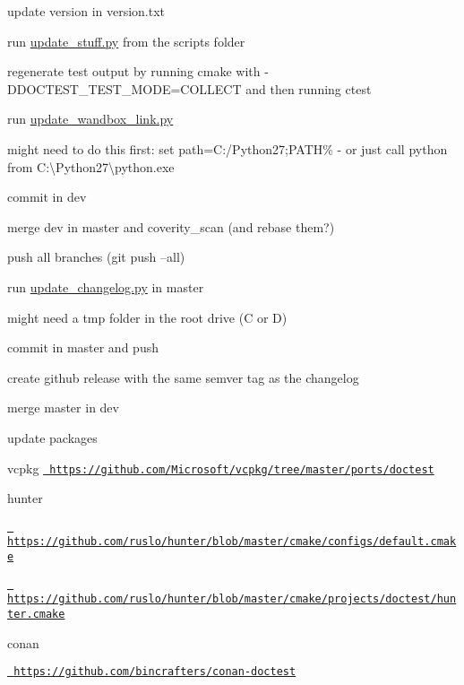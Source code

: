
\begin{DoxyItemize}
\item update version in version.\+txt
\end{DoxyItemize}

run \mbox{\hyperlink{update__stuff_8py}{update\+\_\+stuff.\+py}} from the scripts folder
\begin{DoxyItemize}
\item regenerate test output by running cmake with -\/DDOCTEST\+\_\+\+TEST\+\_\+\+MODE=COLLECT and then running ctest
\item run \mbox{\hyperlink{update__wandbox__link_8py}{update\+\_\+wandbox\+\_\+link.\+py}}
\begin{DoxyItemize}
\item might need to do this first\+: set path=C\+:/\+Python27;PATH\% -\/ or just call python from C\+:\textbackslash{}\+Python27\textbackslash{}python.exe
\end{DoxyItemize}
\item commit in dev
\item merge dev in master and coverity\+\_\+scan (and rebase them?)
\item push all branches (git push --all)
\item run \mbox{\hyperlink{update__changelog_8py}{update\+\_\+changelog.\+py}} in master
\begin{DoxyItemize}
\item might need a tmp folder in the root drive (C or D)
\end{DoxyItemize}
\item commit in master and push
\item create github release with the same semver tag as the changelog
\item merge master in dev
\item update packages
\begin{DoxyItemize}
\item vcpkg \href{https://github.com/Microsoft/vcpkg/tree/master/ports/doctest}{\texttt{ https\+://github.\+com/\+Microsoft/vcpkg/tree/master/ports/doctest}}
\item hunter
\begin{DoxyItemize}
\item \href{https://github.com/ruslo/hunter/blob/master/cmake/configs/default.cmake}{\texttt{ https\+://github.\+com/ruslo/hunter/blob/master/cmake/configs/default.\+cmake}}
\item \href{https://github.com/ruslo/hunter/blob/master/cmake/projects/doctest/hunter.cmake}{\texttt{ https\+://github.\+com/ruslo/hunter/blob/master/cmake/projects/doctest/hunter.\+cmake}}
\end{DoxyItemize}
\item conan
\begin{DoxyItemize}
\item \href{https://github.com/bincrafters/conan-doctest}{\texttt{ https\+://github.\+com/bincrafters/conan-\/doctest}} 
\end{DoxyItemize}
\end{DoxyItemize}
\end{DoxyItemize}